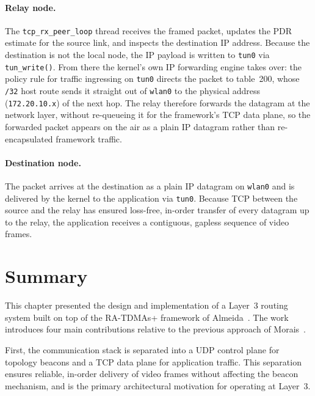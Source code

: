 \paragraph{Relay node.}
The \texttt{tcp\_rx\_peer\_loop} thread receives the framed packet, updates the PDR estimate
for the source link, and inspects the destination IP address. Because the destination is not
the local node, the IP payload is written to \texttt{tun0} via \texttt{tun\_write()}. From
there the kernel's own IP forwarding engine takes over: the policy rule for traffic ingressing
on \texttt{tun0} directs the packet to table~200, whose \texttt{/32} host route sends it
straight out of \texttt{wlan0} to the physical address (\texttt{172.20.10.x}) of the next
hop. The relay therefore forwards the datagram at the network layer, without re-queueing it
for the framework's TCP data plane, so the forwarded packet appears on the air as a plain IP
datagram rather than re-encapsulated framework traffic.

\paragraph{Destination node.}
The packet arrives at the destination as a plain IP datagram on \texttt{wlan0} and is
delivered by the kernel to the application via \texttt{tun0}. Because TCP between the source
and the relay has ensured loss-free, in-order transfer of every datagram up to the relay, the
application receives a contiguous, gapless sequence of video frames.



\section{Summary}
\label{sec:impl-summary}

This chapter presented the design and implementation of a Layer~3 routing system built on
top of the RA-TDMAs+ framework of Almeida~\cite{almeida2023synchronization}. The work
introduces four main contributions relative to the previous approach of
Morais~\cite{morais2024synchronization}.

First, the communication stack is separated into a UDP control plane for topology beacons
and a TCP data plane for application traffic. This separation ensures reliable, in-order
delivery of video frames without affecting the beacon mechanism, and is the primary
architectural motivation for operating at Layer~3.

